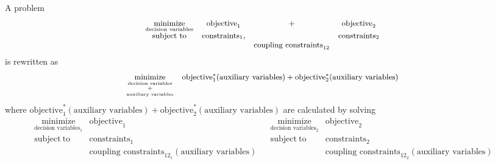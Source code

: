 \documentclass[../main.tex]{subfiles}
\begin{document}
A problem
\begin{equation}\label{eq:general_coupled_optimization_problem}
  \small
  \begin{aligned}
    \begin{matrix}
      \underset{\text{decision variables}}{\mathrm{minimize}}  &\text{objective}_{1}&+&\text{objective}_{2}&\\
      \mathrm{subject~ to} & \text{constraints}_{1},&&  \text{constraints}_{2}\\
      &&\text{coupling constraints}_{12}&
    \end{matrix}
  \end{aligned}
\end{equation}
is rewritten as
\begin{equation}\label{eq:general_coupled_optimization_problem_decomposed_main_problem}
  \small
  \begin{aligned}
    \begin{matrix}
      \underset{\mathop{\operatorname{+}}\limits^{\text{decision variables}}_{\text{auxiliary variables}}}{\mathrm{minimize}}  &\text{objective}^{*}_{1}(\text{auxiliary variables})+\text{objective}^{*}_{2}(\text{auxiliary variables})&\\
    \end{matrix}
  \end{aligned}
\end{equation}
where $\text{objective}^{*}_{1}(\text{auxiliary variables})+\text{objective}^{*}_{2}(\text{auxiliary variables})$ are calculated by solving
\begin{subequations}\label{eq:general_coupled_optimization_problem_decomposed}
\begin{equation}\label{eq:general_coupled_optimization_problem_decomposed_1}
    \begin{matrix}
      \underset{\text{decision variables}_{1}}{\mathrm{minimize}}  &\text{objective}_{1}&\\

      \mathrm{subject~ to} & \text{constraints}_{1}\\
      &\text{coupling constraints}_{12_{1}}(\text{auxiliary variables})
    \end{matrix}
\end{equation}
\begin{equation}\label{eq:general_coupled_optimization_problem_decomposed_2}
    \begin{matrix}
      \underset{\text{decision variables}_{2}}{\mathrm{minimize}}  &\text{objective}_{2}&\\

      \mathrm{subject~ to} & \text{constraints}_{2}\\
      &\text{coupling constraints}_{12_{2}}(\text{auxiliary variables})
    \end{matrix}
\end{equation}
\end{subequations}
\end{document}

